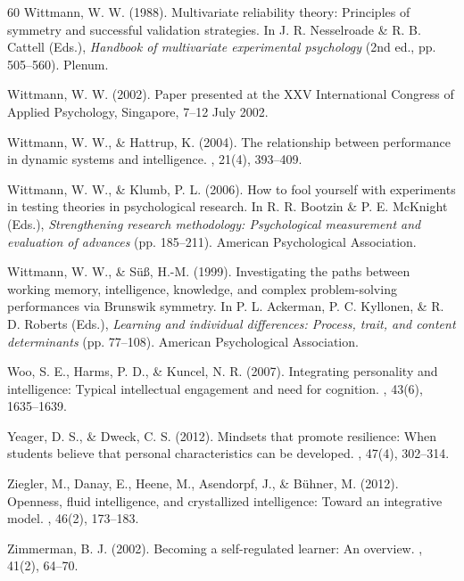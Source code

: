 \documentclass[12pt,a4paper]{article}
\begin{document}
\begin{thebibliography}{60}
Wittmann, W. W. (1988).
\newblock Multivariate reliability theory: Principles of symmetry and successful validation strategies.
\newblock In J. R. Nesselroade \& R. B. Cattell (Eds.), {\em Handbook of multivariate experimental psychology} (2nd ed., pp. 505--560). Plenum.

Wittmann, W. W. (2002).
\newblock Paper presented at the XXV International Congress of Applied Psychology, Singapore, 7--12 July 2002.

Wittmann, W. W., \& Hattrup, K. (2004).
\newblock The relationship between performance in dynamic systems and intelligence.
, 21(4), 393--409.

Wittmann, W. W., \& Klumb, P. L. (2006).
\newblock How to fool yourself with experiments in testing theories in psychological research.
\newblock In R. R. Bootzin \& P. E. McKnight (Eds.), {\em Strengthening research methodology: Psychological measurement and evaluation of advances} (pp. 185--211). American Psychological Association.

Wittmann, W. W., \& S\"u\ss{}, H.-M. (1999).
\newblock Investigating the paths between working memory, intelligence, knowledge, and complex problem-solving performances via Brunswik symmetry.
\newblock In P. L. Ackerman, P. C. Kyllonen, \& R. D. Roberts (Eds.), {\em Learning and individual differences: Process, trait, and content determinants} (pp. 77--108). American Psychological Association.

Woo, S. E., Harms, P. D., \& Kuncel, N. R. (2007).
\newblock Integrating personality and intelligence: Typical intellectual engagement and need for cognition.
, 43(6), 1635--1639.

Yeager, D. S., \& Dweck, C. S. (2012).
\newblock Mindsets that promote resilience: When students believe that personal characteristics can be developed.
, 47(4), 302--314.

Ziegler, M., Danay, E., Heene, M., Asendorpf, J., \& B\"uhner, M. (2012).
\newblock Openness, fluid intelligence, and crystallized intelligence: Toward an integrative model.
, 46(2), 173--183.

Zimmerman, B. J. (2002).
\newblock Becoming a self-regulated learner: An overview.
, 41(2), 64--70.

\end{thebibliography}
\end{document}
